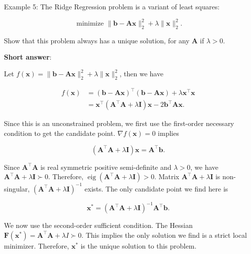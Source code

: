 Example 5: The Ridge Regression problem is a variant of least squares:

\[
	\text { minimize }\|\boldsymbol{b}-\boldsymbol{A} \boldsymbol{x}\|_{2}^{2}+\lambda\|\boldsymbol{x}\|_{2}^{2} .
\]

Show that this problem always has a unique solution, for any \(\boldsymbol{A}\) if \(\lambda>0\).

\textbf{Short answer}:

Let \(f(\boldsymbol{x})=\|\boldsymbol{b}-\boldsymbol{A} \boldsymbol{x}\|_{2}^{2}+\lambda\|\boldsymbol{x}\|_{2}^{2}\), then we have

\[
	\begin{aligned}
		f(\boldsymbol{x}) & =(\boldsymbol{b}-\boldsymbol{A} \boldsymbol{x})^{\top}(\boldsymbol{b}-\boldsymbol{A} \boldsymbol{x})+\lambda \boldsymbol{x}^{\top} \boldsymbol{x} \\
		& =\boldsymbol{x}^{\top}\left(\boldsymbol{A}^{\top} \boldsymbol{A}+\lambda \boldsymbol{I}\right) \boldsymbol{x}-2 \boldsymbol{b}^{\top} \boldsymbol{A} \boldsymbol{x} .
	\end{aligned}
\]

Since this is an unconstrained problem, we first use the first-order necessary condition to get the candidate point. \(\nabla f(\boldsymbol{x})=0\) implies

\[
	\left(\boldsymbol{A}^{\top} \boldsymbol{A}+\lambda \boldsymbol{I}\right) \boldsymbol{x}=\boldsymbol{A}^{\top} \boldsymbol{b}.
\]

Since \(\boldsymbol{A}^{\top} \boldsymbol{A}\) is real symmetric positive semi-definite and \(\lambda>0\), we have \(\boldsymbol{A}^{\top} \boldsymbol{A}+\lambda \boldsymbol{I} \succ 0\). Therefore, \(\operatorname{eig}\left(\boldsymbol{A}^{\top} \boldsymbol{A}+\lambda \boldsymbol{I} \right)>0\). Matrix \(\boldsymbol{A}^{\top} \boldsymbol{A}+\lambda \boldsymbol{I}\) is non-singular, \(\left(\boldsymbol{A}^{\top} \boldsymbol{A}+\lambda \boldsymbol{I}\right)^{-1}\) exists. The only candidate point we find here is

\[
	\boldsymbol{x}^{*}=\left(\boldsymbol{A}^{\top} \boldsymbol{A}+\lambda \boldsymbol{I} \right)^{-1} \boldsymbol{A}^{\top} \boldsymbol{b} .
\]

We now use the second-order sufficient condition. The Hessian \(\boldsymbol{F} \left(\boldsymbol{x}^{*}\right)=\boldsymbol{A}^{\top} \boldsymbol{A}+ \lambda I \succ 0\). This implies the only solution we find is a strict local minimizer. Therefore, \(\boldsymbol{x}^{*}\) is the unique solution to this problem.
